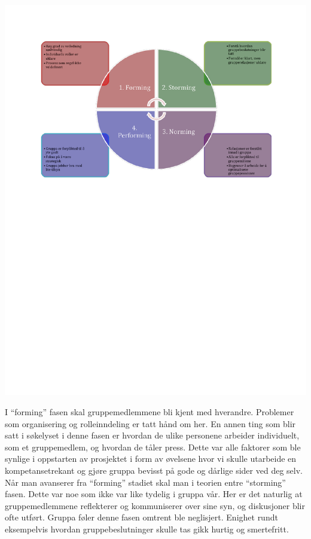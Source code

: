 \begin{center}
\includegraphics[scale=0.9,
trim=2.7cm 14cm 0cm 5cm]{Faserigruppesamarbeid.pdf}
\label{fig:faserigruppesamarbeid}
\end{center}

I ``forming'' fasen skal gruppemedlemmene bli kjent med hverandre. Problemer som organisering og rolleinndeling er tatt hånd om her. En annen ting som blir satt i søkelyset i denne fasen er hvordan de ulike personene arbeider individuelt, som et gruppemedlem, og hvordan de tåler press. Dette var alle faktorer som ble synlige i oppstarten av prosjektet i form av øvelsene hvor vi skulle utarbeide en kompetansetrekant og gjøre gruppa bevisst på gode og dårlige sider ved deg selv.\\

Når man avanserer fra ``forming'' stadiet skal man i teorien entre ``storming'' fasen. Dette var noe som ikke var like tydelig i gruppa vår. Her er det naturlig at gruppemedlemmene reflekterer og kommuniserer over sine syn, og diskusjoner blir ofte utført. Gruppa føler denne fasen omtrent ble neglisjert. Enighet rundt eksempelvis hvordan gruppebeslutninger skulle tas gikk hurtig og smertefritt.\\

